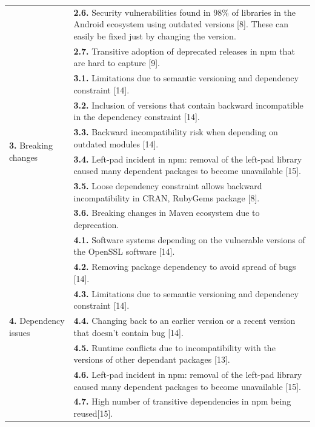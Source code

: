 \documentclass[conference]{IEEEtran}
\begin{document}
\begin{table}[!t]
\begin{tabular}{|p{3cm}|p{14cm}|}
					      & \textbf{2.6.} Security vulnerabilities found in 98\% of libraries in the Android ecosystem using outdated versions [8]. These can easily be fixed just by changing the version. \\
					      & \textbf{2.7.} Transitive adoption of deprecated releases in npm that are hard to capture [9].  \\
        \hline
        \multirow{6}{*}{\textbf{3.} Breaking changes} & \textbf{3.1.} Limitations due to semantic versioning and dependency constraint [14]. \\
						    & \textbf{3.2.} Inclusion of versions that contain backward incompatible in the dependency constraint [14].  \\
						    &\textbf{3.3.} Backward incompatibility risk when depending on outdated modules [14].  \\
						    & \textbf{3.4.} Left-pad incident in npm: removal of the left-pad library caused many dependent packages to become unavailable [15]. \\
						    & \textbf{3.5.} Loose dependency constraint allows backward incompatibility in CRAN, RubyGems package [8].\\
						   & \textbf{3.6.}  Breaking changes in Maven ecosystem due to deprecation.\\
       \hline
        \multirow{7}{*}{\textbf{4.} Dependency issues} & \textbf{4.1.} Software systems depending on the vulnerable versions of the  OpenSSL software [14].\\
						     & \textbf{4.2.} Removing package dependency to avoid spread of bugs [14]. \\	
						     & \textbf{4.3.} Limitations due to semantic versioning and dependency constraint [14].\\
						     & \textbf{4.4.} Changing back to an earlier version or a recent version that doesn’t contain bug [14].\\
						     & \textbf{4.5.} Runtime conflicts due to incompatibility with
the versions of other dependant packages [13].
 \\
						     & \textbf{4.6.} Left-pad incident in npm: removal of the left-pad library caused many dependent packages to become unavailable [15].  \\
						     & \textbf{4.7.} High number of transitive dependencies in npm  being reused[15].  \\
        \hline
    \end{tabular}
\end{table}
\end{document}
